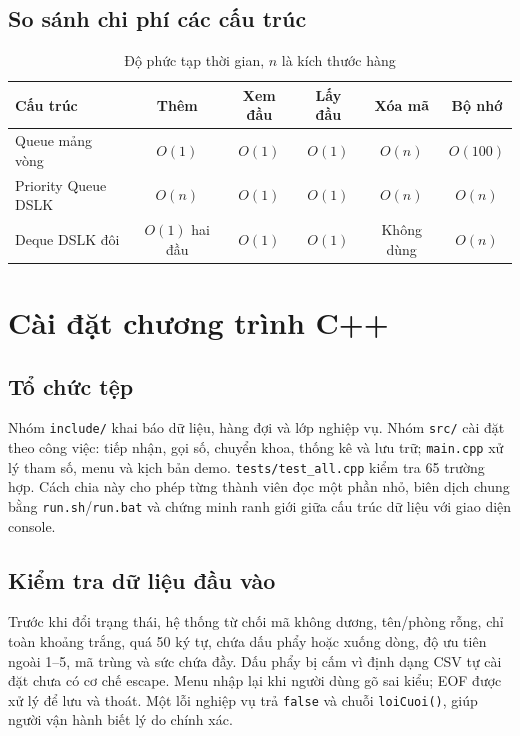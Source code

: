 \documentclass[12pt,a4paper,oneside]{report}
\begin{document}
\section{So sánh chi phí các cấu trúc}
\begin{table}[H]\centering\caption{Độ phức tạp thời gian, $n$ là kích thước hàng}
\begin{tabular}{p{3.2cm}ccccc}\toprule
Cấu trúc & Thêm & Xem đầu & Lấy đầu & Xóa mã & Bộ nhớ\\\midrule
Queue mảng vòng & $O(1)$ & $O(1)$ & $O(1)$ & $O(n)$ & $O(100)$\\
Priority Queue DSLK & $O(n)$ & $O(1)$ & $O(1)$ & $O(n)$ & $O(n)$\\
Deque DSLK đôi & $O(1)$ hai đầu & $O(1)$ & $O(1)$ & Không dùng & $O(n)$\\\bottomrule
\end{tabular}
\end{table}

\chapter{Cài đặt chương trình C++}
\section{Tổ chức tệp}
Nhóm \texttt{include/} khai báo dữ liệu, hàng đợi và lớp nghiệp vụ. Nhóm \texttt{src/} cài đặt theo công việc: tiếp nhận, gọi số, chuyển khoa, thống kê và lưu trữ; \texttt{main.cpp} xử lý tham số, menu và kịch bản demo. \texttt{tests/test\_all.cpp} kiểm tra 65 trường hợp. Cách chia này cho phép từng thành viên đọc một phần nhỏ, biên dịch chung bằng \texttt{run.sh}/\texttt{run.bat} và chứng minh ranh giới giữa cấu trúc dữ liệu với giao diện console.

\section{Kiểm tra dữ liệu đầu vào}
Trước khi đổi trạng thái, hệ thống từ chối mã không dương, tên/phòng rỗng, chỉ toàn khoảng trắng, quá 50 ký tự, chứa dấu phẩy hoặc xuống dòng, độ ưu tiên ngoài 1--5, mã trùng và sức chứa đầy. Dấu phẩy bị cấm vì định dạng CSV tự cài đặt chưa có cơ chế escape. Menu nhập lại khi người dùng gõ sai kiểu; EOF được xử lý để lưu và thoát. Một lỗi nghiệp vụ trả \texttt{false} và chuỗi \texttt{loiCuoi()}, giúp người vận hành biết lý do chính xác.
\end{document}
